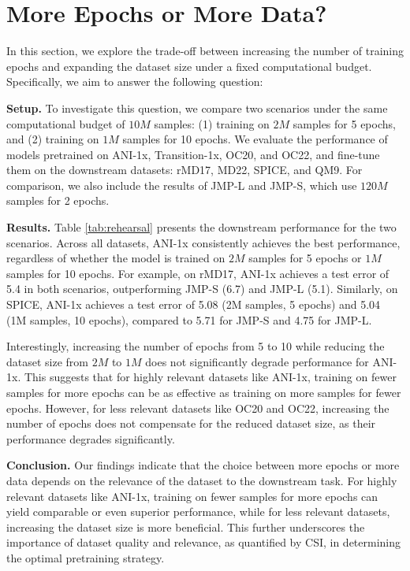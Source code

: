 \section{More Epochs or More Data?}

In this section, we explore the trade-off between increasing the number of training epochs and expanding the dataset size under a fixed computational budget. Specifically, we aim to answer the following question:


\textbf{Setup.} To investigate this question, we compare two scenarios under the same computational budget of \(10M\) samples: (1) training on \(2M\) samples for 5 epochs, and (2) training on \(1M\) samples for 10 epochs. We evaluate the performance of models pretrained on ANI-1x, Transition-1x, OC20, and OC22, and fine-tune them on the downstream datasets: rMD17, MD22, SPICE, and QM9. For comparison, we also include the results of JMP-L and JMP-S, which use \(120M\) samples for 2 epochs.

\textbf{Results.} Table \ref{tab:rehearsal} presents the downstream performance for the two scenarios. Across all datasets, ANI-1x consistently achieves the best performance, regardless of whether the model is trained on \(2M\) samples for 5 epochs or \(1M\) samples for 10 epochs. For example, on rMD17, ANI-1x achieves a test error of 5.4 in both scenarios, outperforming JMP-S (6.7) and JMP-L (5.1). Similarly, on SPICE, ANI-1x achieves a test error of 5.08 (2M samples, 5 epochs) and 5.04 (1M samples, 10 epochs), compared to 5.71 for JMP-S and 4.75 for JMP-L.

Interestingly, increasing the number of epochs from 5 to 10 while reducing the dataset size from \(2M\) to \(1M\) does not significantly degrade performance for ANI-1x. This suggests that for highly relevant datasets like ANI-1x, training on fewer samples for more epochs can be as effective as training on more samples for fewer epochs. However, for less relevant datasets like OC20 and OC22, increasing the number of epochs does not compensate for the reduced dataset size, as their performance degrades significantly.

\textbf{Conclusion.} Our findings indicate that the choice between more epochs or more data depends on the relevance of the dataset to the downstream task. For highly relevant datasets like ANI-1x, training on fewer samples for more epochs can yield comparable or even superior performance, while for less relevant datasets, increasing the dataset size is more beneficial. This further underscores the importance of dataset quality and relevance, as quantified by CSI, in determining the optimal pretraining strategy.





\clearpage

